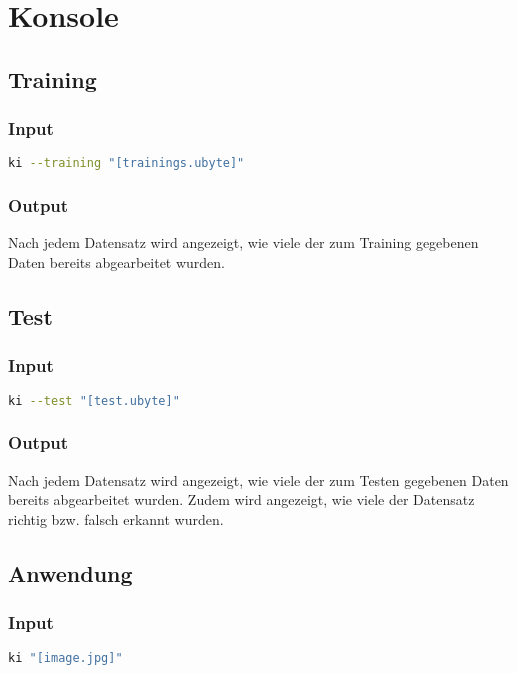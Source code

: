 \section{Konsole}
\label{sec:DesignKonsole}
\subsection{Training}
\label{sec:DesignTraining}
\subsubsection{Input}
\label{sec:DesignTraiInput}
\begin{lstlisting}[language=bash]
ki --training "[trainings.ubyte]"
\end{lstlisting}

\subsubsection{Output}
\label{sec:TraiOutput}
Nach jedem Datensatz wird angezeigt, wie viele der zum Training gegebenen Daten bereits abgearbeitet wurden. 

\subsection{Test}
\label{sec:DesignTest}
\subsubsection{Input}
\label{sec:DesignTestInput}
\begin{lstlisting}[language=bash]
ki --test "[test.ubyte]"
\end{lstlisting}

\subsubsection{Output}
\label{sec:TestOutput}
Nach jedem Datensatz wird angezeigt, wie viele der zum Testen gegebenen Daten bereits abgearbeitet wurden. Zudem wird angezeigt, wie viele der Datensatz richtig bzw. falsch erkannt wurden.



\subsection{Anwendung}
\label{sec:DesignAnwendung}
\subsubsection{Input}
\label{sec:DesignUseInput}
\begin{lstlisting}[language=bash]
ki "[image.jpg]"
\end{lstlisting}


